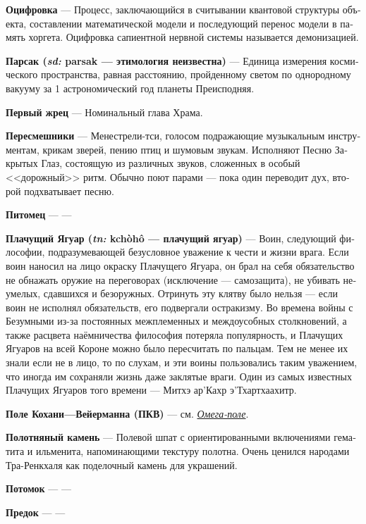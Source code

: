 \documentclass[a4paper,12pt,fleqn]{book}\usepackage{cooltooltips}\usepackage{polyglossia}\setdefaultlanguage[babelshorthands=true]{russian}\setotherlanguage{english}\defaultfontfeatures{Ligatures=TeX,Mapping=tex-text} \usepackage{xcolor}\definecolor{lightgray}{HTML}{bbbbbb}\color{lightgray}\newcommand{\ml}[3]{\textenglish{\textcolor{black}{#3}}}
\newcommand{\theterm}[3]{\textbf{\hypertarget{#1}{#2}} --- #3}
\newcommand{\thesynonim}[3]{\textbf{#2} --- см. \textit{\hyperlink{#1}{#3}}.}
\newcommand{\theorigin}[3]{\textit{#1:} #2 --- #3}
\begin{document}
{\theterm{digitalization}
{Оцифровка}
{Процесс, заключающийся в считывании квантовой структуры объекта, составлении математической модели и последующий перенос модели в память хоргета.
Оцифровка сапиентной нервной системы называется демонизацией.}

\theterm{parsac}
{Парсак (\theorigin{sd}{parsak}{этимология неизвестна})}
{Единица измерения космического пространства, равная расстоянию, пройденному светом по однородному вакууму за 1 астрономический год планеты Преисподняя.}

\theterm{head-priest}
{Первый жрец}
{Номинальный глава Храма.}

\theterm{mockingbard}
{Пересмешники}
{Менестрели-тси, голосом подражающие музыкальным инструментам, крикам зверей, пению птиц и шумовым звукам.
Исполняют Песню Закрытых Глаз, состоящую из различных звуков, сложенных в особый <<дорожный>> ритм.
Обычно поют парами --- пока один переводит дух, второй подхватывает песню.}

\theterm{nurseling}
{Питомец}
{---}

\theterm{crying-jaguar}
{Плачущий Ягуар (\theorigin{tn}{kch\`{o}h\^{o}}{плачущий ягуар})}
{Воин, следующий философии, подразумевающей безусловное уважение к чести и жизни врага.
Если воин наносил на лицо окраску Плачущего Ягуара, он брал на себя обязательство не обнажать оружие на переговорах (исключение --- самозащита), не убивать неумелых, сдавшихся и безоружных.
Отринуть эту клятву было нельзя --- если воин не исполнял обязательств, его подвергали остракизму.
Во времена войны с Безумными из-за постоянных межплеменных и междоусобных столкновений, а также расцвета наёмничества философия потеряла популярность, и Плачущих Ягуаров на всей Короне можно было пересчитать по пальцам.
Тем не менее их знали если не в лицо, то по слухам, и эти воины пользовались таким уважением, что иногда им сохраняли жизнь даже заклятые враги.
Один из самых известных Плачущих Ягуаров того времени --- Митхэ ар’Кахр э’Тхартхаахитр.}

\thesynonim{omega-field} %
{Поле Кохани---Вейерманна (ПКВ)}
{Омега-поле}

\theterm{weavingstone}
{Полотняный камень}
{Полевой шпат с ориентированными включениями гематита и ильменита, напоминающими текстуру полотна.
Очень ценился народами Тра-Ренкхаля как поделочный камень для украшений.}

\theterm{scion}
{Потомок}
{---}

\theterm{root}
{Предок}
{---}

}
\end{document}
